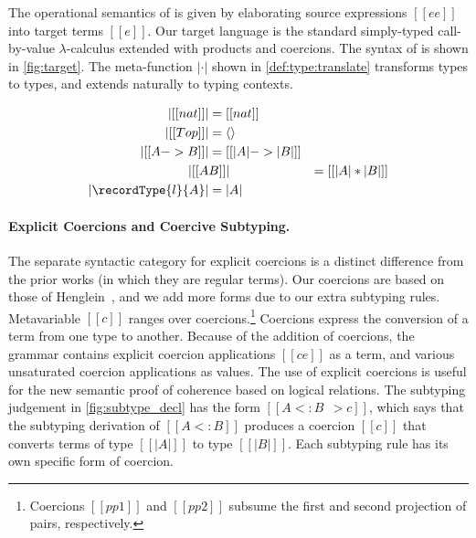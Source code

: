 The operational semantics of \namee is given by elaborating source expressions
$[[ee]]$ into target terms $[[e]]$. Our target language \tname is the standard
simply-typed call-by-value $\lambda$-calculus extended with products and coercions.
The syntax of \tname is shown in \cref{fig:target}. The
meta-function $| \cdot |$ shown in \cref{def:type:translate} transforms \namee
types to \tname types, and extends naturally to typing contexts.

\begin{definition} \label{def:type:translate}
  \begin{align*}
    | [[nat]] | &= [[nat]] \\
    | [[Top]] | &= \langle \rangle \\
    | [[A -> B]]  | &= [[ | A | -> | B |  ]] \\
    | [[ A & B  ]] | &= [[ | A | * | B |  ]] \\
    | \recordType{l}{A} | &= | A |
  \end{align*}
\end{definition}



\paragraph{Explicit Coercions and Coercive Subtyping.}

The separate syntactic category for explicit coercions is a distinct
difference from the prior works (in which they are regular terms). Our coercions
are based on those of Henglein~\citep{Henglein_1994}, and we add more forms due to our
extra subtyping rules.
Metavariable $[[c]]$ ranges over coercions.\footnote{Coercions $[[pp1]]$ and $[[pp2]]$ subsume the first and second projection of pairs, respectively.}
Coercions express the conversion
of a term from one type to another. Because of the addition of coercions, the
grammar contains explicit coercion applications $[[c e]]$ as a term, and various
unsaturated coercion applications as values. The use of explicit coercions is useful for the new semantic
proof of coherence based on logical relations.
The subtyping judgement in \cref{fig:subtype_decl} has the form $[[A <: B ~~> c]]$, which says that the
subtyping derivation of $[[A <: B]]$ produces a coercion $[[c]]$ that converts
terms of type $[[ |A| ]]$ to type $[[ |B| ]]$. Each subtyping rule has its own
specific form of coercion.




